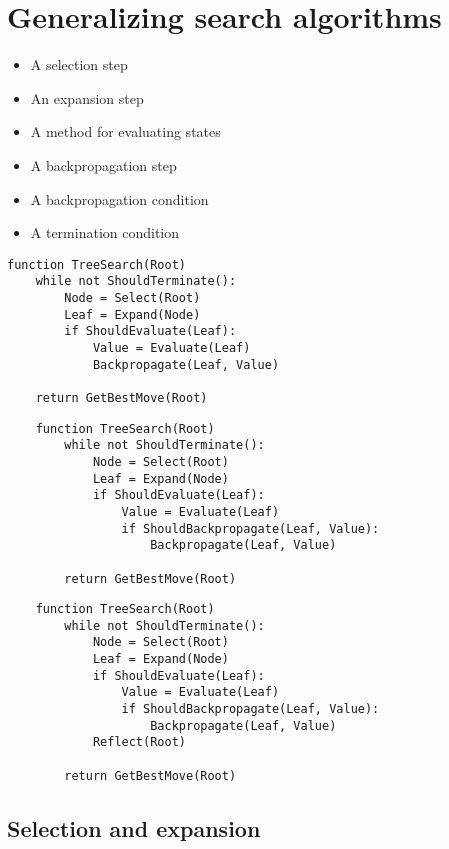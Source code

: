 \section{Generalizing search algorithms}



\begin{itemize}
    \item A selection step
    \item An expansion step
    \item A method for evaluating states
    \item A backpropagation step
    \item A backpropagation condition
    \item A termination condition
\end{itemize}





\begin{lstlisting}
function TreeSearch(Root)
    while not ShouldTerminate():
        Node = Select(Root)
        Leaf = Expand(Node)
        if ShouldEvaluate(Leaf):
            Value = Evaluate(Leaf)
            Backpropagate(Leaf, Value)

    return GetBestMove(Root)
\end{lstlisting}

\begin{lstlisting}
    function TreeSearch(Root)
        while not ShouldTerminate():
            Node = Select(Root)
            Leaf = Expand(Node)
            if ShouldEvaluate(Leaf):
                Value = Evaluate(Leaf)
                if ShouldBackpropagate(Leaf, Value):
                    Backpropagate(Leaf, Value)
    
        return GetBestMove(Root)
\end{lstlisting}

\begin{lstlisting}
    function TreeSearch(Root)
        while not ShouldTerminate():
            Node = Select(Root)
            Leaf = Expand(Node)
            if ShouldEvaluate(Leaf):
                Value = Evaluate(Leaf)
                if ShouldBackpropagate(Leaf, Value):
                    Backpropagate(Leaf, Value)
            Reflect(Root)

        return GetBestMove(Root)
\end{lstlisting}
    


\subsection{Selection and expansion}

